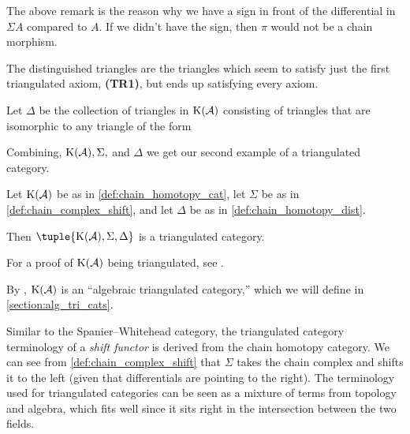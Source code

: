 The above remark is the reason why we have a sign in front of the differential in \( \Sigma A \) compared to \( A \). If we didn't have the sign, then \( \pi \) would not be a chain morphism.

The distinguished triangles are the triangles which seem to satisfy just the first triangulated axiom, {\bf (TR1)}, but ends up satisfying every axiom.

\begin{definition}
    \label{def:chain_homotopy_dist}
    Let \( \Delta \) be the collection of triangles in \( \operatorname{K}({\mathcal{A}}) \) consisting of triangles that are isomorphic to any triangle of the form

    \begin{center}
    \end{center}
\end{definition}

Combining, \( \operatorname{K}({\mathcal{A}}), \Sigma, \) and \( \Delta \) we get our second example of a triangulated category.

\begin{example}
    Let \( \operatorname{K}({\mathcal{A}}) \) be as in \autoref{def:chain_homotopy_cat}, let \( \Sigma \) be as in \autoref{def:chain_complex_shift}, and let \( \Delta \) be as in \autoref{def:chain_homotopy_dist}.

    Then \( \tuple{\K(\Ac), \Sigma, \Delta} \) is a triangulated category.
\end{example}
For a proof of \( \operatorname{K}({\mathcal{A}}) \) being triangulated, see \cite[Proposition 3.5.25]{Zimmermann_2014}.

By \cite[Subsection 7.5]{Krause_2007}, \( \operatorname{K}({\mathcal{A}}) \) is an ``algebraic triangulated category,'' which we will define in \autoref{section:alg_tri_cats}.

Similar to the Spanier--Whitehead category, the triangulated category terminology of a \emph{shift functor} is derived from the chain homotopy category. We can see from \autoref{def:chain_complex_shift} that \( \Sigma \) takes the chain complex and shifts it to the left (given that differentials are pointing to the right). The terminology used for triangulated categories can be seen as a mixture of terms from topology and algebra, which fits well since it sits right in the intersection between the two fields.
